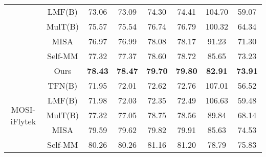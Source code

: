 \documentclass[11pt]{article}
\begin{document}
\begin{table*}[tbp]
{\begin{tabular}{l|l|llllll}
        & \multicolumn{1}{c|}{LMF(B)} & \multicolumn{1}{c}{73.06} & \multicolumn{1}{c}{73.09} &  \multicolumn{1}{c}{74.30} & \multicolumn{1}{c}{74.41} & \multicolumn{1}{c}{104.70}       & \multicolumn{1}{c}{59.07} \\
		  & \multicolumn{1}{c|}{MulT(B)} & \multicolumn{1}{c}{75.57} & \multicolumn{1}{c}{75.54} &  \multicolumn{1}{c}{76.74} & \multicolumn{1}{c}{76.79} & \multicolumn{1}{c}{100.32}       & \multicolumn{1}{c}{64.34} \\
		  & \multicolumn{1}{c|}{MISA} & \multicolumn{1}{c}{76.97} & \multicolumn{1}{c}{76.99} &  \multicolumn{1}{c}{78.08} & \multicolumn{1}{c}{78.17} & \multicolumn{1}{c}{91.23}       & \multicolumn{1}{c}{71.30} \\
		  & \multicolumn{1}{c|}{Self-MM} & \multicolumn{1}{c}{77.32} & \multicolumn{1}{c}{77.37} &  \multicolumn{1}{c}{78.60} & \multicolumn{1}{c}{78.72} & \multicolumn{1}{c}{85.65}       & \multicolumn{1}{c}{73.23} \\
		  \cline{2-8}
		  & \multicolumn{1}{c|}{Ours} & \multicolumn{1}{c}{\textbf{78.43}} & \multicolumn{1}{c}{\textbf{78.47}} &  \multicolumn{1}{c}{\textbf{79.70}} & \multicolumn{1}{c}{\textbf{79.80}} & \multicolumn{1}{c}{\textbf{82.91}}       & \multicolumn{1}{c}{\textbf{73.91}} \\
		  \hline
		  \multicolumn{1}{c|}{\multirow{6}{*}{MOSI-iFlytek}}   & \multicolumn{1}{c|}{TFN(B)} & \multicolumn{1}{c}{71.95} & \multicolumn{1}{c}{72.01} &  \multicolumn{1}{c}{72.62} & \multicolumn{1}{c}{72.76} & \multicolumn{1}{c}{107.01}       & \multicolumn{1}{c}{56.52} \\
		  & \multicolumn{1}{c|}{LMF(B)} & \multicolumn{1}{c}{71.98} & \multicolumn{1}{c}{72.03} &  \multicolumn{1}{c}{72.35} & \multicolumn{1}{c}{72.49} & \multicolumn{1}{c}{106.63}       & \multicolumn{1}{c}{59.48} \\
		  & \multicolumn{1}{c|}{MulT(B)} & \multicolumn{1}{c}{77.32} & \multicolumn{1}{c}{77.05} &  \multicolumn{1}{c}{78.75} & \multicolumn{1}{c}{78.56} & \multicolumn{1}{c}{89.84}       & \multicolumn{1}{c}{68.14} \\
		  & \multicolumn{1}{c|}{MISA} & \multicolumn{1}{c}{79.59} & \multicolumn{1}{c}{79.62} &  \multicolumn{1}{c}{79.82} & \multicolumn{1}{c}{79.91} & \multicolumn{1}{c}{85.63}       & \multicolumn{1}{c}{74.53} \\
		  & \multicolumn{1}{c|}{Self-MM} & \multicolumn{1}{c}{80.26} & \multicolumn{1}{c}{80.26} &  \multicolumn{1}{c}{81.16} & \multicolumn{1}{c}{81.20} & \multicolumn{1}{c}{78.79}       & \multicolumn{1}{c}{75.83} \\

\end{tabular}}
\end{table*}
\end{document}
